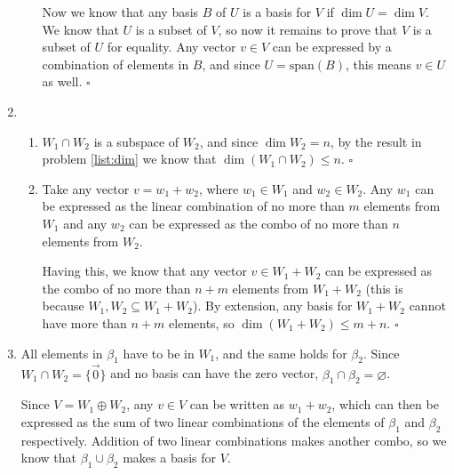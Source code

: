 \documentclass[12pt]{article}
\begin{document}
\begin{enumerate}
\begin{enumerate}
                        Now we know that any basis $B$ of $U$ is a basis for $V$ if $\dim U=\dim V$.
                        We know that $U$ is a subset of $V$, so now it remains to prove that $V$ is a subset of $U$ for equality.
                        Any vector $v \in V$ can be expressed by a combination of elements in $B$,
                        and since $U=\text{span}(B)$, this means $v \in U$ as well. $\square$
            \end{enumerate}
      \item \begin{enumerate}
                  \item $W_1 \cap W_2$ is a subspace of $W_2$, and since $\dim W_2=n$, by the result in problem \ref{list:dim} we know that $\dim(W_1 \cap W_2) \le n$. $\square$
                  \item Take any vector $v=w_1+w_2$, where $w_1 \in W_1$ and $w_2 \in W_2$.
                        Any $w_1$ can be expressed as the linear combination of no more than $m$ elements from $W_1$
                        and any $w_2$ can be expressed as the combo of no more than $n$ elements from $W_2$.

                        Having this, we know that any vector $v \in W_1+W_2$ can be expressed as the combo
                        of no more than $n+m$ elements from $W_1+W_2$ (this is because $W_1, W_2 \subseteq W_1+W_2$).
                        By extension, any basis for $W_1+W_2$ cannot have more than $n+m$ elements, so $\dim(W_1+W_2) \le m+n$. $\square$
            \end{enumerate}
      \item All elements in $\beta_1$ have to be in $W_1$, and the same holds for $\beta_2$.
            Since $W_1 \cap W_2=\{\vec{0}\}$ and no basis can have the zero vector, $\beta_1 \cap \beta_2=\varnothing$.

            Since $V=W_1 \oplus W_2$, any $v \in V$ can be written as $w_1+w_2$,
            which can then be expressed as the sum of two linear combinations of the elements of $\beta_1$ and $\beta_2$ respectively.
            Addition of two linear combinations makes another combo, so we know that $\beta_1 \cup \beta_2$ makes a basis for $V$.
\end{enumerate}
\end{document}
